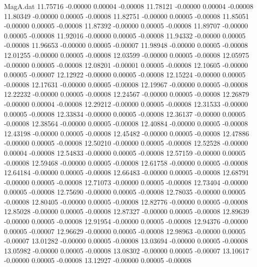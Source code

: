 \begin{filecontents}{MagA.dat}
  11.75716   -0.00000    0.00004   -0.00008
  11.78121   -0.00000    0.00004   -0.00008
  11.80349   -0.00000    0.00005   -0.00008
  11.82751   -0.00000    0.00005   -0.00008
  11.85051   -0.00000    0.00005   -0.00008
  11.87392   -0.00000    0.00005   -0.00008
  11.89707   -0.00000    0.00005   -0.00008
  11.92016   -0.00000    0.00005   -0.00008
  11.94332   -0.00000    0.00005   -0.00008
  11.96653   -0.00000    0.00005   -0.00007
  11.98948   -0.00000    0.00005   -0.00008
  12.01255   -0.00000    0.00005   -0.00008
  12.03599   -0.00000    0.00005   -0.00008
  12.05975   -0.00000    0.00005   -0.00008
  12.08201   -0.00001    0.00005   -0.00008
  12.10605   -0.00000    0.00005   -0.00007
  12.12922   -0.00000    0.00005   -0.00008
  12.15224   -0.00000    0.00005   -0.00008
  12.17631   -0.00000    0.00005   -0.00008
  12.19967   -0.00000    0.00005   -0.00008
  12.22232   -0.00000    0.00005   -0.00008
  12.24567   -0.00000    0.00005   -0.00008
  12.26879   -0.00000    0.00004   -0.00008
  12.29212   -0.00000    0.00005   -0.00008
  12.31533   -0.00000    0.00005   -0.00008
  12.33834   -0.00000    0.00005   -0.00008
  12.36137   -0.00000    0.00005   -0.00008
  12.38564   -0.00000    0.00005   -0.00008
  12.40884   -0.00000    0.00005   -0.00008
  12.43198   -0.00000    0.00005   -0.00008
  12.45482   -0.00000    0.00005   -0.00008
  12.47886   -0.00000    0.00005   -0.00008
  12.50210   -0.00000    0.00005   -0.00008
  12.52528   -0.00000    0.00004   -0.00008
  12.54833   -0.00000    0.00005   -0.00008
  12.57159   -0.00000    0.00005   -0.00008
  12.59468   -0.00000    0.00005   -0.00008
  12.61758   -0.00000    0.00005   -0.00008
  12.64184   -0.00000    0.00005   -0.00008
  12.66483   -0.00000    0.00005   -0.00008
  12.68791   -0.00000    0.00005   -0.00008
  12.71073   -0.00000    0.00005   -0.00008
  12.73404   -0.00000    0.00005   -0.00008
  12.75690   -0.00000    0.00005   -0.00008
  12.78035   -0.00000    0.00005   -0.00008
  12.80405   -0.00000    0.00005   -0.00008
  12.82776   -0.00000    0.00005   -0.00008
  12.85028   -0.00000    0.00005   -0.00008
  12.87327   -0.00000    0.00005   -0.00008
  12.89639   -0.00000    0.00005   -0.00008
  12.91954   -0.00000    0.00005   -0.00008
  12.94376   -0.00000    0.00005   -0.00007
  12.96629   -0.00000    0.00005   -0.00008
  12.98963   -0.00000    0.00005   -0.00007
  13.01282   -0.00000    0.00005   -0.00008
  13.03694   -0.00000    0.00005   -0.00008
  13.05982   -0.00000    0.00005   -0.00008
  13.08302   -0.00000    0.00005   -0.00007
  13.10617   -0.00000    0.00005   -0.00008
  13.12927   -0.00000    0.00005   -0.00008

\end{filecontents}
